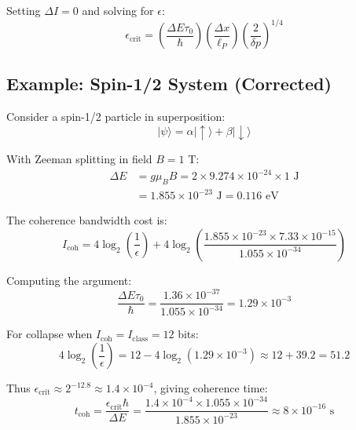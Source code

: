 \documentclass[twocolumn,prd,amsmath,amssymb,aps,superscriptaddress,nofootinbib]{revtex4-2}
\begin{document}
Setting $\Delta I = 0$ and solving for $\epsilon$:
\begin{equation}
\epsilon_{\text{crit}} = \left(\frac{\Delta E \tau_0}{\hbar}\right) \left(\frac{\Delta x}{\ell_P}\right) \left(\frac{2}{\delta p}\right)^{1/4}
\label{eq:collapse_condition}
\end{equation}

\subsection{Example: Spin-1/2 System (Corrected)}

Consider a spin-1/2 particle in superposition:
\begin{equation}
|\psi\rangle = \alpha|\uparrow\rangle + \beta|\downarrow\rangle
\end{equation}

With Zeeman splitting in field $B = 1$ T:
\begin{align}
\Delta E &= g\mu_B B = 2 \times 9.274 \times 10^{-24} \times 1 \text{ J} \\
&= 1.855 \times 10^{-23} \text{ J} = 0.116 \text{ eV}
\end{align}

The coherence bandwidth cost is:
\begin{equation}
I_{\text{coh}} = 4 \log_2\left(\frac{1}{\epsilon}\right) + 4 \log_2\left(\frac{1.855 \times 10^{-23} \times 7.33 \times 10^{-15}}{1.055 \times 10^{-34}}\right)
\end{equation}

Computing the argument:
\begin{equation}
\frac{\Delta E \tau_0}{\hbar} = \frac{1.36 \times 10^{-37}}{1.055 \times 10^{-34}} = 1.29 \times 10^{-3}
\end{equation}

For collapse when $I_{\text{coh}} = I_{\text{class}} = 12$ bits:
\begin{equation}
4 \log_2\left(\frac{1}{\epsilon}\right) = 12 - 4\log_2(1.29 \times 10^{-3}) \approx 12 + 39.2 = 51.2
\end{equation}

Thus $\epsilon_{\text{crit}} \approx 2^{-12.8} \approx 1.4 \times 10^{-4}$, giving coherence time:
\begin{equation}
t_{\text{coh}} = \frac{\epsilon_{\text{crit}} \hbar}{\Delta E} = \frac{1.4 \times 10^{-4} \times 1.055 \times 10^{-34}}{1.855 \times 10^{-23}} \approx 8 \times 10^{-16} \text{ s}
\end{equation}
\end{document}
